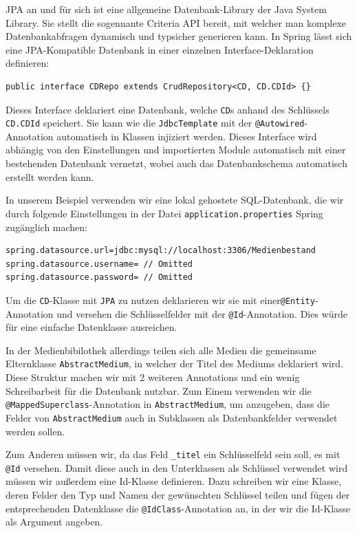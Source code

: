 \documentclass{article}
\begin{document}
JPA an und für sich ist eine allgemeine Datenbank-Library der Java System Library.
Sie stellt die sogennante Criteria API bereit, mit welcher man komplexe Datenbankabfragen dynamisch und typsicher generieren kann.
In Spring lässt sich eine JPA-Kompatible Datenbank in einer einzelnen Interface-Deklaration definieren:

\begin{lstlisting}
public interface CDRepo extends CrudRepository<CD, CD.CDId> {}
\end{lstlisting}

Dieses Interface deklariert eine Datenbank, welche \texttt{CD}s anhand des Schlüssels \texttt{CD.CDId} speichert.
Sie kann wie die \texttt{JdbcTemplate} mit der \texttt{@Autowired}-Annotation automatisch in Klassen injiziert werden.
Dieses Interface wird abhängig von den Einstellungen und importierten Module automatisch mit einer bestehenden Datenbank vernetzt, wobei auch das Datenbankschema automatisch erstellt werden kann.

In unserem Beispiel verwenden wir eine lokal gehostete SQL-Datenbank, die wir durch folgende Einstellungen in der Datei \texttt{application.properties} Spring zugänglich machen:

\begin{lstlisting}
spring.datasource.url=jdbc:mysql://localhost:3306/Medienbestand 
spring.datasource.username= // Omitted
spring.datasource.password= // Omitted
\end{lstlisting}

Um die \texttt{CD}-Klasse mit \texttt{JPA} zu nutzen deklarieren wir sie mit einer\texttt{@Entity}-Annotation und versehen die Schlüsselfelder mit der \texttt{@Id}-Annotation.
Dies würde für eine einfache Datenklasse ausreichen.

In der Medienbibilothek allerdings teilen sich alle Medien die gemeinsame Elternklasse \texttt{AbstractMedium}, in welcher der Titel des Mediums deklariert wird.
Diese Struktur machen wir mit 2 weiteren Annotations und ein wenig Schreibarbeit für die Datenbank nutzbar.
Zum Einem verwenden wir die \texttt{@MappedSuperclass}-Annotation in \texttt{AbstractMedium}, um anzugeben, dass die Felder von \texttt{AbstractMedium} auch in Subklassen als Datenbankfelder verwendet werden sollen.

Zum Anderen müssen wir, da das Feld \texttt{\_titel} ein Schlüsselfeld sein soll, es mit \texttt{@Id} versehen.
Damit diese auch in den Unterklassen als Schlüssel verwendet wird müssen wir außerdem eine Id-Klasse definieren.
Dazu schreiben wir eine Klasse, deren Felder den Typ und Namen der gewünschten Schlüssel teilen und fügen der entsprechenden Datenklasse die \texttt{@IdClass}-Annotation an, in der wir die Id-Klasse als Argument angeben.
\end{document}
